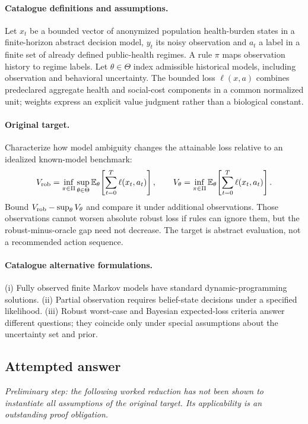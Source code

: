 \documentclass[11pt]{article}
\newcommand{\E}{\mathbb E}
\providecommand{\E}{\mathbb E}
\begin{document}
\paragraph{Catalogue definitions and assumptions.}
Let $x_t$ be a bounded vector of anonymized population health-burden states in a finite-horizon abstract decision model, $y_t$ its noisy observation and $a_t$ a label in a finite set of already defined public-health regimes. A rule $\pi$ maps observation history to regime labels. Let $\theta\in\Theta$ index admissible historical models, including observation and behavioral uncertainty. The bounded loss $\ell(x,a)$ combines predeclared aggregate health and social-cost components in a common normalized unit; weights express an explicit value judgment rather than a biological constant.
\paragraph{Original target.}
Characterize how model ambiguity changes the attainable loss relative to an idealized known-model benchmark:
    \[V_{\rm rob}=\inf_{\pi\in\Pi}\sup_{\theta\in\Theta}\E_\theta
    \!\left[\sum_{t=0}^{T}\ell(x_t,a_t)\right],\qquad
    V_\theta=\inf_{\pi\in\Pi}\E_\theta\!\left[\sum_{t=0}^{T}\ell(x_t,a_t)\right].\]
    Bound $V_{\rm rob}-\sup_\theta V_\theta$ and compare it under additional observations. Those observations cannot worsen absolute robust loss if rules can ignore them, but the robust-minus-oracle gap need not decrease. The target is abstract evaluation, not a recommended action sequence.
\paragraph{Catalogue alternative formulations.}
(i) Fully observed finite Markov models have standard dynamic-programming solutions. (ii) Partial observation requires belief-state decisions under a specified likelihood. (iii) Robust worst-case and Bayesian expected-loss criteria answer different questions; they coincide only under special assumptions about the uncertainty set and prior.
\subsection{Attempted answer}
\noindent\emph{Preliminary step: the following worked reduction has not been shown to instantiate all assumptions of the original target. Its applicability is an outstanding proof obligation.}
\end{document}
